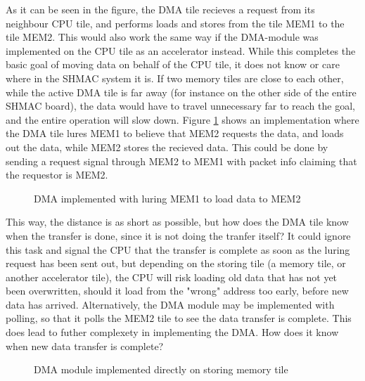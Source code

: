 As it can be seen in the figure, the DMA tile recieves a request from its neighbour CPU tile, and performs loads and stores from the tile MEM1 to the tile MEM2.
This would also work the same way if the DMA-module was implemented on the CPU tile as an accelerator instead.
While this completes the basic goal of moving data on behalf of the CPU tile, it does not know or care where in the SHMAC system it is.
If two memory tiles are close to each other, while the active DMA tile is far away (for instance on the other side of the entire SHMAC board), the data would have to travel unnecessary far to reach the goal, and the entire operation will slow down.
Figure \ref{fig:DMASHMAC2} shows an implementation where the DMA tile lures MEM1 to believe that MEM2 requests the data, and loads out the data, while MEM2 stores the recieved data.
This could be done by sending a request signal through MEM2 to MEM1 with packet info claiming that the requestor is MEM2. 

\begin{figure}[h!]
    \centering
    \caption{DMA implemented with luring MEM1 to load data to MEM2}
    \label{fig:DMASHMAC2}
\end{figure}
 
This way, the distance is as short as possible, but how does the DMA tile know when the transfer is done, since it is not doing the tranfer itself?
It could ignore this task and signal the CPU that the transfer is complete as soon as the luring request has been sent out, but depending on the storing tile (a memory tile, or another accelerator tile), the CPU will risk loading old data that has not yet been overwritten, should it load from the "wrong" address too early, before new data has arrived.
Alternatively, the DMA module may be implemented with polling, so that it polls the MEM2 tile to see the data transfer is complete.
This does lead to futher complexety in implementing the DMA.
How does it know when new data transfer is complete?
 
\begin{figure}[h!]
    \centering
    \caption{DMA module implemented directly on storing memory tile}
    \label{fig:DMASHMAC3}
\end{figure}
 

